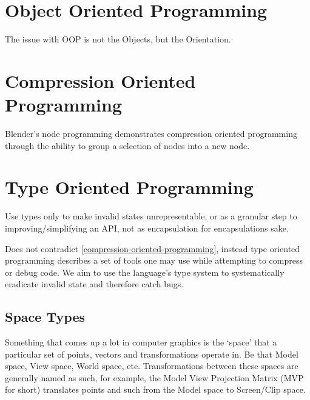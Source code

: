 \documentclass{article}
\begin{document}
\cite{augmentating-human-intellect}
\cite{mother-of-all-demos}
\cite{augmentation-of-douglas-engelbart}
\cite{written-for-eyes}
\cite{the-future-of-programming}
\cite{a-few-words-on-doug-engelbart}
\cite{inventing-on-principle}

\section[object-oriented-programming]{Object Oriented Programming}

The issue with OOP is not the Objects, but the Orientation.

\section[compression-oriented-programming]{Compression Oriented Programming}

\cite{designing-and-evaluating-reusable-components}
\cite{immediate-mode-gui}
\cite{five-second-stall}
\cite{semantic-compression}
\cite{complexity-and-granularity}
\cite{thirty-million-line-problem}
\cite{twitter-and-visual-studio-rant}
\cite{how-fast-should-an-unoptimised-terminal-run}
\cite{simple-code-high-performance}
\cite{where-does-bad-code-come-from}
\cite{the-only-unbreakable-law}

Blender's node programming demonstrates compression oriented programming
through the ability to group a selection of nodes into a new node.

\section[type-oriented-programming]{Type Oriented Programming}

Use types only to make invalid states unrepresentable,
or as a granular\cite{complexity-and-granularity} step to
improving/simplifying an API,
not as encapsulation for encapsulations sake.

Does not contradict \ref{compression-oriented-programming},
instead type oriented programming describes a set of tools one may use while
attempting to compress or debug code.
We aim to use the language's type system to systematically eradicate invalid
state and therefore catch bugs.

\subsection[space-types]{Space Types}

Something that comes up a lot in computer graphics is the `space' that a
particular set of points, vectors and transformations operate in.
Be that Model space, View space, World space, etc.
Transformations between these spaces are generally named as such,
for example, the Model View Projection Matrix (MVP for short) translates points
and such from the Model space to Screen/Clip space.
\end{document}
